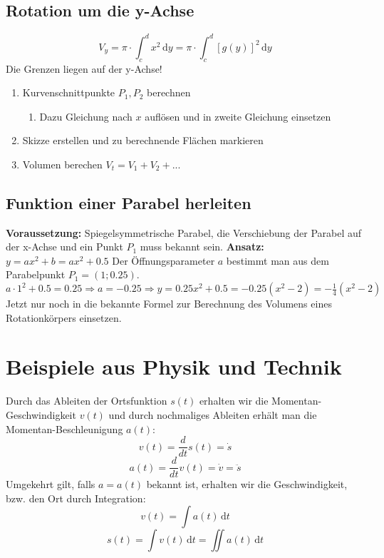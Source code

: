 \subsection{Rotation um die y-Achse} %
\label{sub:rotation_um_die_y_achse}
\[ V_y = \pi \cdot \int_c^d x^2\,\mathrm{d}y = \pi \cdot \int_c^d [g(y)]^2\,\mathrm{d}y \]
Die Grenzen liegen auf der y-Achse! 
\begin{enumerate}
	\item Kurvenschnittpunkte \(P_1, P_2\) berechnen
	\begin{enumerate}
		\item Dazu Gleichung nach \(x\) auflösen und in zweite Gleichung einsetzen
	\end{enumerate}
	\item Skizze erstellen und zu berechnende Flächen markieren
	\item Volumen berechen \(V_t = V_1 + V_2 + ... \)
\end{enumerate}
\subsection{Funktion einer Parabel herleiten} %
\label{sub:funktion_einer_parabel_herleiten}
\textbf{Voraussetzung:} Spiegelsymmetrische Parabel, die Verschiebung der Parabel auf der x-Achse und ein Punkt \(P_1\) muss bekannt sein.\newline
\textbf{Ansatz:} \(y = ax^2 + b = ax^2 + 0.5\)\newline
Der Öffnungsparameter \(a\) bestimmt man aus dem Parabelpunkt \(P_1 = (1; 0.25) \).\newline
\( a \cdot 1^2 + 0.5 = 0.25 \Rightarrow a = -0.25 \Rightarrow y = 0.25x^2 + 0.5 = -0.25(x^2-2) = -\frac{1}{4}(x^2 - 2)\)\newline
Jetzt nur noch in die bekannte Formel zur Berechnung des Volumens eines Rotationkörpers einsetzen.
\section{Beispiele aus Physik und Technik} %
\label{sec:beispiele_aus_physik_und_technik}
Durch das Ableiten der Ortsfunktion \( s(t) \) erhalten wir die Momentan-Geschwindigkeit \(v(t)\) und durch nochmaliges Ableiten erhält man die Momentan-Beschleunigung \(a(t)\):
\[ v(t) = \frac { d }{ dt } s(t) = \dot { s } \]
\[ a(t) = \frac { d }{ dt } v(t) = \dot { v } = \ddot{s}\]
Umgekehrt gilt, falls \( a = a(t) \) bekannt ist, erhalten wir die Geschwindigkeit, bzw. den Ort durch Integration:
\[ v(t) = \int a(t)\,\mathrm{d}t \]
\[ s(t) = \int v(t)\,\mathrm{d}t = \iint a(t)\,\mathrm{d}t\]

